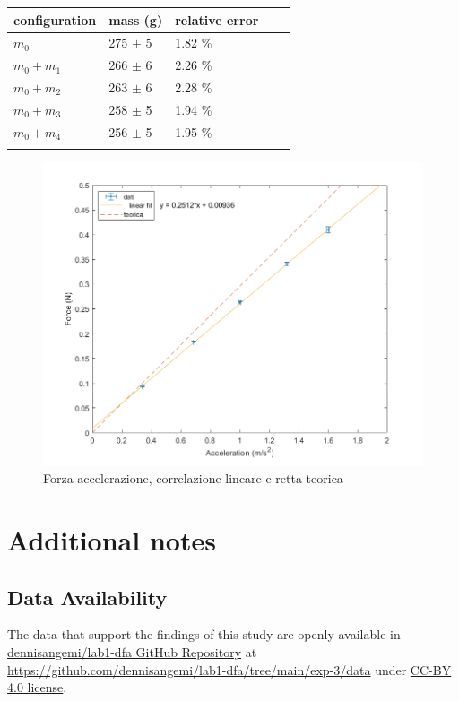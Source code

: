 \documentclass[11pt,a4paper]{article}
\begin{document}
\begin{longtable}[]{@{}lllll@{}}
\toprule
configuration & mass (g) & relative error \tabularnewline
\midrule
\endhead
$m_0$ & 275 $\pm$ 5 & 1.82 \% \tabularnewline
$m_0+m_1$ & 266 $\pm$ 6 & 2.26 \% \tabularnewline
$m_0+m_2$ & 263 $\pm$ 6 & 2.28 \% \tabularnewline
$m_0+m_3$ & 258 $\pm$ 5 & 1.94 \% \tabularnewline
$m_0+m_4$ & 256 $\pm$ 5 & 1.95 \% \tabularnewline
\bottomrule
\label{output3}
\end{longtable}

\begin{figure}[H]
\includegraphics[scale=0.5]{plot-4.png}
\centering
\caption{Forza-accelerazione, correlazione lineare e retta teorica}
\label{plot:lincor}
\end{figure}

\section{Additional notes}

\subsection{Data Availability}
The data that support the findings of this study are openly available in \href{https://github.com/dennisangemi/lab1-dfa/tree/main/exp-3/data}{dennisangemi/lab1-dfa GitHub Repository} at \href{https://github.com/dennisangemi/lab1-dfa/tree/main/exp-3/data}{https://github.com/dennisangemi/lab1-dfa/tree/main/exp-3/data} under \href{https://creativecommons.org/licenses/by/4.0/}{CC-BY 4.0 license}.
\end{document}
